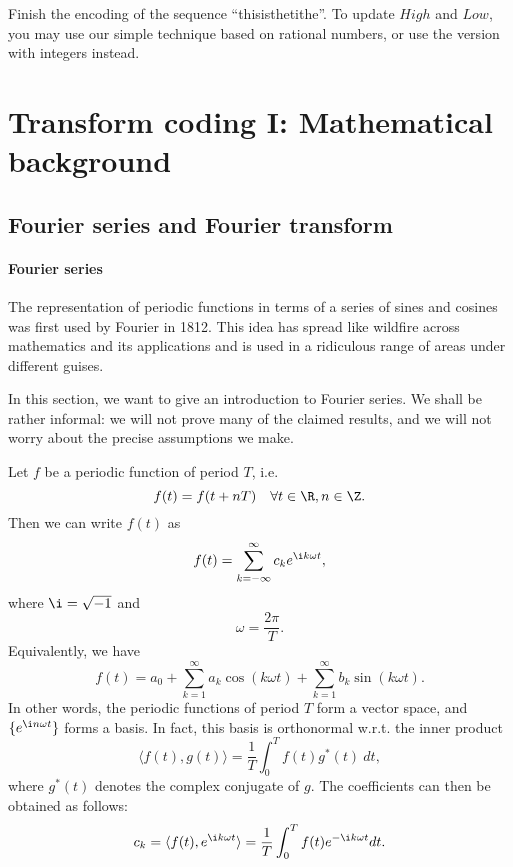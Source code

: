 \documentclass[a4paper, 11pt, openany]{book}
\begin{document}
\begin{exercise}
Finish the encoding of the sequence ``this\textvisiblespace is\textvisiblespace the\textvisiblespace tithe''. To update $High$ and $Low$, you may use our simple technique based on rational numbers, or use the version with integers instead.
\end{exercise}




\section{Transform coding I: Mathematical background}
\label{sec:06}



\subsection{Fourier series and Fourier transform}

\paragraph{Fourier series}
The representation of periodic functions in terms of a series of sines and cosines was first used by Fourier in 1812. This idea has spread like wildfire across mathematics and its applications and is used in a ridiculous range of areas under different guises.

In this section, we want to give an introduction to Fourier series. We shall be rather informal: we will not prove many of the claimed results, and we will not worry about the precise assumptions we make.

Let $f$ be a periodic function of period $T$, i.e.
\[
    f(t) = f(t + nT) \quad \forall t \in \R, n \in \Z.
\]
Then we can write $f(t)$ as
\[
    f(t) = \sum_{k=-\infty}^\infty c_k e^{\i k \omega t},
\]
where $\i = \sqrt{-1}$ and
\[
    \omega = \frac{2 \pi}{ T }.
\]
Equivalently, we have
\[
    f(t) = a_0 + \sum_{k=1}^\infty a_k \cos ( k \omega t ) + \sum_{k=1}^\infty b_k \sin ( k \omega t ).
\]
In other words, the periodic functions of period $T$ form a vector space, and $\{ e^{\i n \omega t} \}$ forms a basis. In fact, this basis is orthonormal w.r.t. the inner product
\[
    \langle f(t), g(t) \rangle = \frac{1}{T} \int_0^T f(t) g^*(t) \ dt,
\]
where $g^*(t)$ denotes the complex conjugate of $g$. The coefficients can then be obtained as follows:
\begin{equation} \label{eq:fourier}
    c_k = \langle f(t), e^{\i k \omega t} \rangle = \frac{1}{T} \int_0^T f(t) e^{-\i k \omega t} dt.
\end{equation}
\end{document}
